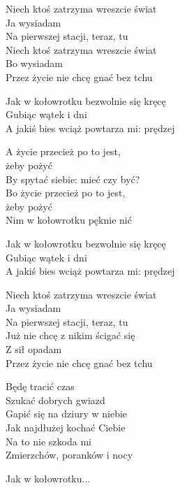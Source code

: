 \begin{text}
    Niech ktoś zatrzyma wreszcie świat\\
    Ja wysiadam\\
    Na pierwszej stacji, teraz, tu\\
    Niech ktoś zatrzyma wreszcie świat\\
    Bo wysiadam\\
    Przez życie nie chcę gnać bez tchu

    Jak w kołowrotku bezwolnie się kręcę\\
    Gubiąc wątek i dni\\
    A jakiś bies wciąż powtarza mi: prędzej

    A życie przecież po to jest,\\
    żeby pożyć\\
    By spytać siebie: mieć czy być?\\
    Bo życie przecież po to jest,\\
    żeby pożyć\\
    Nim w kołowrotku pęknie nić

    Jak w kołowrotku bezwolnie się kręcę\\
    Gubiąc wątek i dni\\
    A jakiś bies wciąż powtarza mi: prędzej

    Niech ktoś zatrzyma wreszcie świat\\
    Ja wysiadam\\
    Na pierwszej stacji, teraz, tu\\
    Już nie chcę z nikim ścigać się\\
    Z sił opadam\\
    Przez życie nie chcę gnać bez tchu

    Będę tracić czas\\
    Szukać dobrych gwiazd\\
    Gapić się na dziury w niebie\\
    Jak najdłużej kochać Ciebie\\
    Na to nie szkoda mi\\
    Zmierzchów, poranków i nocy

    Jak w kołowrotku...
\end{text}
